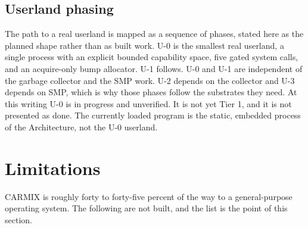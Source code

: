 \documentclass[10pt,twocolumn]{article}
\newcommand{\carmix}{CARMIX}
\begin{document}
\subsection{Userland phasing}

The path to a real userland is mapped as a sequence of phases, stated here as the
planned shape rather than as built work. U-0 is the smallest real userland, a
single process with an explicit bounded capability space, five gated system calls,
and an acquire-only bump allocator. U-1 follows. U-0 and U-1 are independent of the
garbage collector and the SMP work. U-2 depends on the collector and U-3 depends
on SMP, which is why those phases follow the substrates they need. At this writing
U-0 is in progress and unverified. It is not yet Tier 1, and it is not presented
as done. The currently loaded program is the static, embedded process of the
Architecture, not the U-0 userland.

\section{Limitations}

\carmix{} is roughly forty to forty-five percent of the way to a general-purpose
operating system. The following are not built, and the list is the point of this
section.
\end{document}
